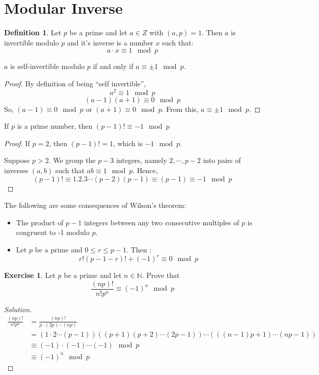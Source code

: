 \documentclass[12pt,letterpaper]{book}
\theoremstyle{definition}
\newtheorem{definition}{Definition} %
\newtheorem*{exercise}{Exercise}
\newenvironment{solution}
  {\renewcommand\qedsymbol{$\blacksquare$}\begin{proof}[Solution]}
  {\end{proof}}
\newcommand{\N}{\mathbb{N}}
\begin{document}
\section{Modular Inverse}

\begin{definition}
  Let $p$ be a prime and let $a \in Z$ with $(a,p) = 1$. Then $a$ is invertible modulo $p$ and it's inverse is a number $x$ such that:
  \[a \cdot x \equiv 1 \mod p\]
\end{definition}

\begin{lemma}
  $a$ is self-invertible modulo $p$ if and only if $a \equiv \pm 1 \mod p$.
\end{lemma}
\begin{proof}
  By definition of being ``self invertible'',
  \[a^2 \equiv 1 \mod p\]
  \[(a-1)(a+1) \equiv 0 \mod p\]
  So, $(a-1) \equiv 0 \mod p$ or $(a+1) \equiv 0\mod p$. From this, $a \equiv \pm 1 \mod p$.
\end{proof}

\begin{theorem}
  If $p$ is a prime number, then $(p-1)! \equiv -1 \mod p$
\end{theorem}
\begin{proof}
  If $p = 2$, then $(p-1)! = 1$, which is $-1 \mod p$.

  Suppose $p > 2$. We group the $p-3$ integers, namely $2,\cdots,p-2$ into pairs of inverses $(a,b)$ such that $ab \equiv 1 \mod p$. Hence,
  \[(p-1)! \equiv 1.2.3 \cdots (p-2)(p-1) \equiv (p-1) \equiv -1 \mod p\]
\end{proof}

The following are some consequences of Wilson's theorem:
\begin{itemize}
  \item The product of $p-1$ integers between any two consecutive multiples of $p$ is congruent to -1 modulo $p$.
  \item Let $p$ be a prime and $0 \leq r \leq p-1$. Then :
    \[r! (p-1-r)! + (-1)^r \equiv 0 \mod p\]
\end{itemize}

\begin{exercise}
  Let $p$ be a prime and let $n \in \N$. Prove that
  \[\frac{(np)!}{n!p^n} \equiv (-1)^n \mod p\]
\end{exercise}
\begin{solution}
  \begin{align*}
    \frac{(np)!}{n!p^n} &= \frac{(np)!}{p \cdot (2p) \cdots (np)} \\
                        &= (1 \cdot 2 \cdots (p-1)) ((p+1)(p+2) \cdots (2p-1)) \cdots (((n-1)p+1) \cdots (np-1)) \\
                        &\equiv (-1) \cdot (-1) \cdots (-1) \mod p \\
                        &\equiv (-1)^n \mod p
  \end{align*}
\end{solution}
\end{document}
